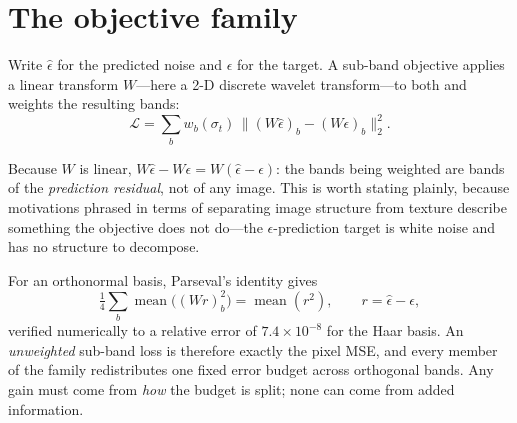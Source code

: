 \section{The objective family}
\label{sec:family}

Write $\hat{\epsilon}$ for the predicted noise and $\epsilon$ for the target.
A sub-band objective applies a linear transform $W$---here a 2-D discrete
wavelet transform---to both and weights the resulting bands:
\begin{equation}
  \mathcal{L} = \sum_{b} w_b(\sigma_t) \,\big\| (W\hat{\epsilon})_b - (W\epsilon)_b \big\|_2^2 .
  \label{eq:family}
\end{equation}

Because $W$ is linear, $W\hat{\epsilon} - W\epsilon = W(\hat{\epsilon} -
\epsilon)$: the bands being weighted are bands of the \emph{prediction
residual}, not of any image. This is worth stating plainly, because motivations
phrased in terms of separating image structure from texture describe something
the objective does not do---the $\epsilon$-prediction target is white noise and
has no structure to decompose.

For an orthonormal basis, Parseval's identity gives
\begin{equation}
  \tfrac{1}{4}\textstyle\sum_b \operatorname{mean}\big((W r)_b^2\big)
  = \operatorname{mean}(r^2), \qquad r = \hat{\epsilon} - \epsilon,
  \label{eq:parseval}
\end{equation}
verified numerically to a relative error of $7.4\times 10^{-8}$ for the Haar
basis. An \emph{unweighted} sub-band loss is therefore exactly the pixel MSE,
and every member of the family redistributes one fixed error budget across
orthogonal bands. Any gain must come from \emph{how} the budget is split; none
can come from added information.
